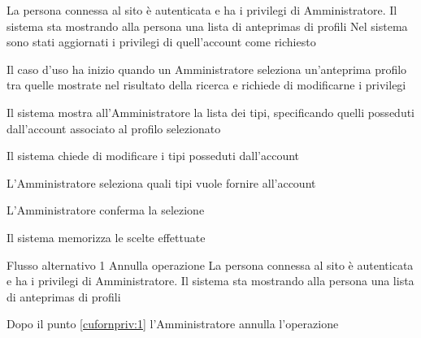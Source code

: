 
{}
{La persona connessa al sito è autenticata e ha i privilegi di Amministratore. Il sistema sta mostrando alla persona una lista di \glspl{anteprima} di profili}
{Nel sistema sono stati aggiornati i privilegi di quell'account come richiesto}
{\begin{enumCU}
	\item Il caso d'uso ha inizio quando un Amministratore seleziona un'\gls{anteprima} profilo tra quelle mostrate nel risultato della ricerca e richiede di modificarne i privilegi
	\item Il sistema mostra all'Amministratore la lista dei tipi, specificando quelli posseduti dall'account associato al profilo selezionato
	\item Il sistema chiede di modificare i tipi posseduti dall'account
	\item L'Amministratore seleziona quali tipi vuole fornire all'account\label{cufornpriv:1}
	\item L'Amministratore conferma la selezione
	\item Il sistema memorizza le scelte effettuate
\end{enumCU}}
%
{Flusso alternativo 1}%
{Annulla operazione}%
{La persona connessa al sito è autenticata e ha i privilegi di Amministratore. Il sistema sta mostrando alla persona una lista di \glspl{anteprima} di profili}%
{\postNulle}%
{\begin{enumCU}
		\item Dopo il punto \ref{cufornpriv:1} l'Amministratore annulla l'operazione
	\end{enumCU}}%


